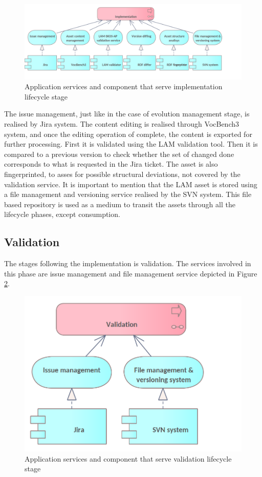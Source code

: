     \begin{figure}[!h]
		\centering
		\includegraphics[width=.95\textwidth]{images/application/lifecycle/Implementation.png}
		\caption{Application services and component that serve implementation lifecycle stage}
		\label{fig:app-implementation}
	\end{figure}
	
	The issue management, just like in the case of evolution management stage, is realised by Jira system. The content editing is realised through VocBench3 system, and once the editing operation of complete, the content is exported for further processing. First it is validated using the LAM validation tool. Then it is compared to a previous version to check whether the set of changed done corresponds to what is requested in the Jira ticket. The asset is also fingerprinted, to asses for possible structural deviations, not covered by the validation service. It is important to mention that the LAM asset is stored using a file management and versioning service realised by the SVN system. This file based repository is used as a medium to transit the assets through all the lifecycle phases, except consumption. 

	\subsection{Validation}
	
	The stages following the implementation is validation. The services involved in this phase are issue management and file management service depicted in Figure \ref{fig:app-validation}.
		
	 \begin{figure}[!h]
		\centering
		\includegraphics[width=.5\textwidth]{images/application/lifecycle/Validation.png}
		\caption{Application services and component that serve validation lifecycle stage}
		\label{fig:app-validation}
	\end{figure}	
	

